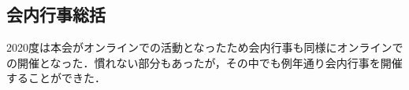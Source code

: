 \subsection*{会内行事総括}

2020度は本会がオンラインでの活動となったため会内行事も同様にオンラインでの開催となった．慣れない部分もあったが，その中でも例年通り会内行事を開催することができた．
